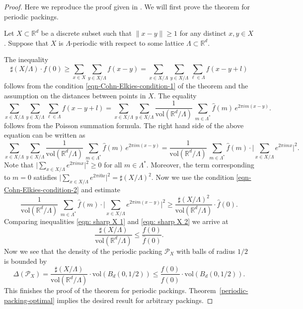   \begin{proof}
  Here we reproduce the proof given in \cite{ElkiesCohn}. We will first prove the theorem for periodic packings.

   Let $X\subset\mathbb{R}^d$ be a discrete subset  such that $\|x-y\|\geq 1$ for any distinct $x,y\in X$.
  Suppose that $X$ is $\Lambda$-periodic with respect to some lattice $\Lambda\subset\mathbb{R}^d$.

   The inequality
  \begin{equation}\label{eqn: sharp X 1}
  \sharp (X/\Lambda)\cdot f(0)\geq \sum_{x\in X}\sum_{y\in X/\Lambda}f(x-y)=\sum_{x\in X/\Lambda}\sum_{y\in X/\Lambda}\sum_{\ell\in  \Lambda}f(x-y+l)\end{equation}
  follows from the condition \eqref{eqn-Cohn-Elkies-condition-1} of the theorem and the assumption on the distances between points in $X$.
  The equality
  $$\sum_{x\in X/\Lambda}\sum_{y\in X/\Lambda}\sum_{\ell\in  \Lambda}f(x-y+l)=\sum_{x\in X/\Lambda}\sum_{y\in X/\Lambda}\frac{1}{\mathrm{vol}(\mathbb{R}^d/\Lambda)}\,\sum_{m\in \Lambda^*} \widehat{f}(m)\,e^{2\pi i m(x-y)}.$$
  follows from the Poisson summation formula.
  The right hand side of the above equation can be written as
  $$\sum_{x\in X/\Lambda}\sum_{y\in X/\Lambda}\frac{1}{\mathrm{vol}(\mathbb{R}^d/\Lambda)}\,\sum_{m\in \Lambda^*} \widehat{f}(m)\,e^{2\pi i m(x-y)}=\frac{1}{\mathrm{vol}(\mathbb{R}^d/\Lambda)}\,\sum_{m\in \Lambda^*} \widehat{f}(m)\cdot\big|\sum_{x\in X/\Lambda}e^{2\pi i m x}\big|^2.$$
  Note that $\big|\sum_{x\in X/\Lambda}e^{2\pi i m x}\big|^2\geq0$ for all $m\in\Lambda^*$. Moreover,  the term corresponding to $m=0$ satisfies $\big|\sum_{x\in X/\Lambda}e^{2\pi i 0 x}\big|^2=\sharp (X/\Lambda)^2$.
  Now we use the condition \eqref{eqn-Cohn-Elkies-condition-2} and estimate
  \begin{equation}\label{eqn: sharp X 2}\frac{1}{\mathrm{vol}(\mathbb{R}^d/\Lambda)}\,\sum_{m\in \Lambda^*} \widehat{f}(m)\cdot\big|\sum_{x\in X/\Lambda}e^{2\pi i m(x-y)}\big|^2
  \geq \frac{\sharp (X/\Lambda)^2}{\mathrm{vol}(\mathbb{R}^d/\Lambda)}\cdot \widehat{f}(0).
  \end{equation}
  Comparing inequalities \eqref{eqn: sharp X 1} and \eqref{eqn: sharp X 2} we arrive at
  $$\frac{\sharp (X/\Lambda)}{\mathrm{vol}(\mathbb{R}^d/\Lambda)}\leq \frac{f(0)}{\widehat{f}(0)}.$$
  Now we see that the density of the periodic packing $\mathcal{P}_X$ with balls of radius $1/2$ is bounded by
  $$\Delta(\mathcal{P}_X)=\frac{\sharp (X/\Lambda)}{\mathrm{vol}(\mathbb{R}^d/\Lambda)}\cdot{\mathrm{vol}(B_d(0,1/2))}\leq
  \frac{f(0)}{\widehat{f}(0)}\cdot \mathrm{vol}(B_d(0,1/2)).$$
  This finishes the proof of the theorem for periodic packings. Theorem~\ref{periodic-packing-optimal} implies the desired  result for arbitrary packings.
  \end{proof}

